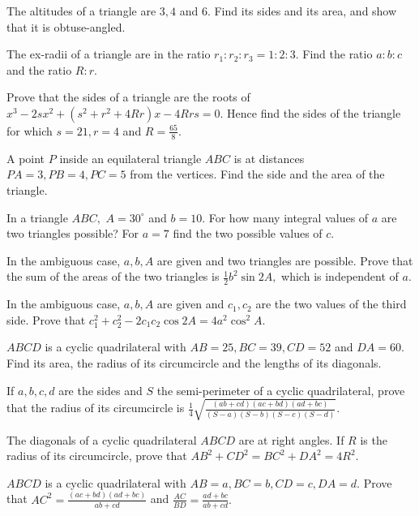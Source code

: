\item The altitudes of a triangle are $3, 4$ and $6.$ Find its sides and its area, and show that it is obtuse-angled.

\item The ex-radii of a triangle are in the ratio $r_1:r_2:r_3 = 1:2:3.$ Find the ratio $a:b:c$ and the ratio $R:r.$

\item Prove that the sides of a triangle are the roots of $x^3 - 2sx^2 + (s^2 + r^2 + 4Rr)x - 4Rrs = 0.$ Hence find the
   sides of the triangle for which $s = 21, r = 4$ and $R = \frac{65}{8}.$

\item A point $P$ inside an equilateral triangle $ABC$ is at distances $PA = 3, PB = 4, PC = 5$ from the vertices. Find the side
   and the area of the triangle.

\item In a triangle $ABC,$ $A = 30^\circ$ and $b = 10.$ For how many integral values of $a$ are two triangles possible? For
   $a = 7$ find the two possible values of $c.$

\item In the ambiguous case, $a, b, A$ are given and two triangles are possible. Prove that the sum of the areas of the two
   triangles is $\frac{1}{2}b^2\sin 2A,$ which is independent of $a.$

\item In the ambiguous case, $a, b, A$ are given and $c_1, c_2$ are the two values of the third side. Prove that $c_1^2 +
   c_2^2 - 2c_1c_2\cos 2A = 4a^2\cos^2A.$

\item $ABCD$ is a cyclic quadrilateral with $AB = 25, BC = 39, CD = 52$ and $DA = 60.$ Find its area, the radius of its
   circumcircle and the lengths of its diagonals.

\item If $a, b, c, d$ are the sides and $S$ the semi-perimeter of a cyclic quadrilateral, prove that the radius of its
   circumcircle is $\frac{1}{4}\sqrt{\frac{(ab + cd)(ac + bd)(ad + bc)}{(S - a)(S - b)(S - c)(S - d)}}.$

\item The diagonals of a cyclic quadrilateral $ABCD$ are at right angles. If $R$ is the radius of its circumcircle, prove that
   $AB^2 + CD^2 = BC^2 + DA^2 = 4R^2.$

\item $ABCD$ is a cyclic quadrilateral with $AB = a, BC = b, CD = c, DA = d.$ Prove that $AC^2 = \frac{(ac + bd)(ad +
   bc)}{ab + cd}$ and $\frac{AC}{BD} = \frac{ad + bc}{ab + cd}.$
\stopitemize
